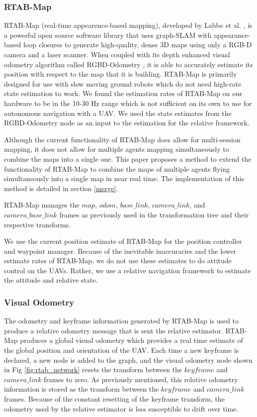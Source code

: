 \documentclass[letterpaper, 10 pt, conference]{ieeeconf}  %
\begin{document}
\subsubsection{RTAB-Map}

RTAB-Map (real-time appearence-based mapping), developed by Labbe et al. \cite{Labbe2011}\cite{Labbe2013}\cite{Labbe2019}, is a powerful open source software library that uses graph-SLAM with appearance-based loop closures to generate high-quality, dense 3D maps using only a RGB-D camera and a laser scanner. When coupled with its depth enhanced visual odometry algorithm called RGBD-Odometry \cite{Labbe2019}, it is able to accurately estimate its position with respect to the map that it is building. RTAB-Map is primarily designed for use with slow moving ground robots which do not need high-rate state estimation to work. We found the estimation rates of RTAB-Map on our hardware to be in the 10-30 Hz range which is not sufficient on its own to use for autonomous navigation with a UAV. We used the state estimates from the RGBD-Odometry node as an input to the estimation for the relative framework.

Although the current functionality of RTAB-Map does allow for multi-session mapping, it does not allow for multiple agents mapping simultaneously to combine the maps into a single one. This paper proposes a method to extend the functionality of RTAB-Map to combine the maps of multiple agents flying simultaneously into a single map in near real time. The implementation of this method is detailed in section \ref{merge}.

RTAB-Map manages the $\mathit{map}$, $\mathit{odom}$, $\mathit{base\_link}$, $\mathit{camera\_link}$, and $\mathit{camera\_base\_link}$ frames as previously used in the transformation tree and their respective transforms.

We use the current position estimate of RTAB-Map for the position controller and waypoint manager. Because of the inevitable inaccuracies and the lower estimate rates of RTAB-Map, we do not use these estimates to do attitude control on the UAVs. Rather, we use a relative navigation framework to estimate the attitude and relative state.

\subsubsection{Visual Odometry} \label{vis_odom}

The odometry and keyframe information generated by RTAB-Map is used to produce a relative odometry message that is sent the relative estimator. RTAB-Map produces a global visual odometry which provides a real time estimate of the global position and orientation of the UAV. Each time a new keyframe is declared, a new node is added to the graph, and the visual odometry node shown in Fig \ref{fig:rtab_network} resets the transform between the $\mathit{keyframe}$ and $\mathit{camera\_link}$ frames to zero. As previously mentioned, this relative odometry information is stored as the transform between the $\mathit{keyframe}$ and $\mathit{camera\_link}$ frames. Because of the constant resetting of the keyframe transform, the odometry used by the relative estimator is less susceptible to drift over time.
\end{document}
